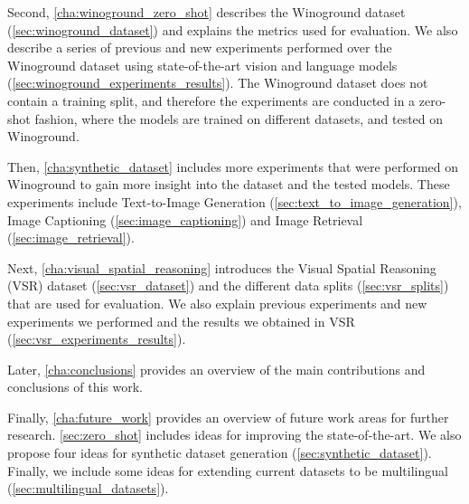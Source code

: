 Second, \cref{cha:winoground_zero_shot} describes the Winoground \cite{thrush2022winoground} dataset (\cref{sec:winoground_dataset}) and explains the metrics used for evaluation. We also describe a series of previous and new experiments performed over the Winoground dataset using state-of-the-art vision and language models (\cref{sec:winoground_experiments_results}). The Winoground dataset does not contain a training split, and therefore the experiments are conducted in a zero-shot fashion, where the models are trained on different datasets, and tested on Winoground.

Then, \cref{cha:synthetic_dataset} includes more experiments that were performed on Winoground to gain more insight into the dataset and the tested models. These experiments include Text-to-Image Generation (\ref{sec:text_to_image_generation}), Image Captioning (\ref{sec:image_captioning}) and Image Retrieval (\ref{sec:image_retrieval}).

Next, \cref{cha:visual_spatial_reasoning} introduces the Visual Spatial Reasoning (VSR) \cite{liu2022visual} dataset (\cref{sec:vsr_dataset}) and the different data splits (\cref{sec:vsr_splits}) that are used for evaluation. We also explain previous experiments and new experiments we performed and the results we obtained in VSR (\cref{sec:vsr_experiments_results}).

Later, \cref{cha:conclusions} provides an overview of the main contributions and conclusions of this work.

Finally, \cref{cha:future_work} provides an overview of future work areas for further research. \cref{sec:zero_shot} includes ideas for improving the state-of-the-art. We also propose four ideas for synthetic dataset generation (\cref{sec:synthetic_dataset}). Finally, we include some ideas for extending current datasets to be multilingual (\cref{sec:multilingual_datasets}).